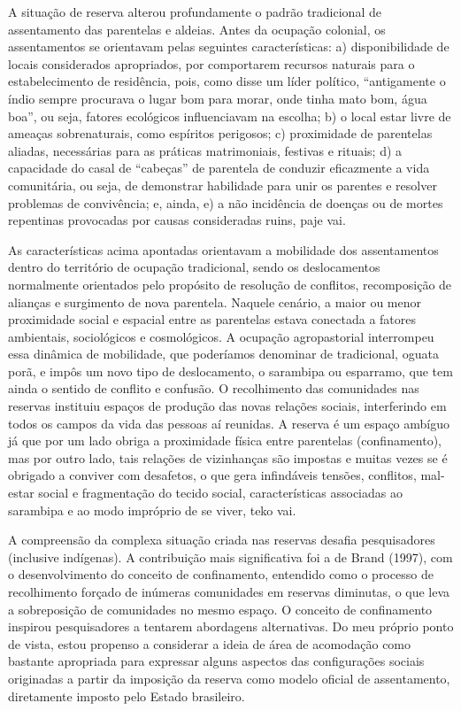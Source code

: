 {{A situação de reserva alterou profundamente o padrão tradicional de
assentamento das parentelas e aldeias. Antes da ocupação colonial, os
assentamentos se orientavam pelas seguintes características: a)
disponibilidade de locais considerados apropriados, por comportarem
recursos naturais para o estabelecimento de residência, pois, como
disse um líder político, ``antigamente o índio sempre procurava o lugar
bom para morar, onde tinha mato bom, água boa'', ou seja, fatores
ecológicos influenciavam na escolha; b) o local estar livre de ameaças
sobrenaturais, como espíritos perigosos; c) proximidade de parentelas
aliadas, necessárias para as práticas matrimoniais, festivas e rituais;
d) a capacidade do casal de ``cabeças'' de parentela de conduzir
eficazmente a vida comunitária, ou seja, de demonstrar habilidade para
unir os parentes e resolver problemas de convivência; e, ainda, e) a
não incidência de doenças ou de mortes repentinas provocadas por causas
consideradas ruins, paje vai.

As características acima apontadas orientavam a mobilidade dos
assentamentos dentro do território de ocupação tradicional, sendo os
deslocamentos normalmente orientados pelo propósito de resolução de
conflitos, recomposição de alianças e surgimento de nova parentela.
Naquele cenário, a maior ou menor proximidade social e espacial entre
as parentelas estava conectada a fatores ambientais, sociológicos e
cosmológicos. A ocupação agropastorial interrompeu essa dinâmica de
mobilidade, que poderíamos denominar de tradicional, oguata porã, e
impôs um novo tipo de deslocamento, o sarambipa ou esparramo, que tem
ainda o sentido de conflito e confusão. O recolhimento das comunidades
nas reservas instituiu espaços de produção das novas relações sociais,
interferindo em todos os campos da vida das pessoas aí reunidas. A
reserva é um espaço ambíguo já que por um lado obriga a proximidade
física entre parentelas (confinamento), mas por outro lado, tais
relações de vizinhanças são impostas e muitas vezes se é obrigado a
conviver com desafetos, o que gera infindáveis tensões, conflitos,
mal-estar social e fragmentação do tecido social, características
associadas ao sarambipa e ao modo impróprio de se viver, teko vai.

A compreensão da complexa situação criada nas reservas desafia
pesquisadores (inclusive indígenas). A contribuição mais significativa
foi a de Brand (1997), com o desenvolvimento do conceito de confinamento,
entendido como o processo de recolhimento forçado de inúmeras
comunidades em reservas diminutas, o que leva a sobreposição de
comunidades no mesmo espaço. O conceito de confinamento inspirou
pesquisadores a tentarem abordagens alternativas. Do meu próprio ponto
de vista, estou propenso a considerar a ideia de área de acomodação
como bastante apropriada para expressar alguns aspectos das
configurações sociais originadas a partir da imposição da reserva como
modelo oficial de assentamento, diretamente imposto pelo Estado
brasileiro. 

}}
